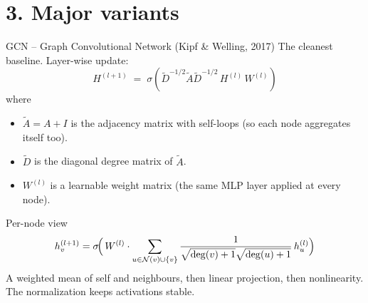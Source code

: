 \documentclass[aspectratio=169,10pt]{beamer}
\begin{document}
\section*{3. Major variants}

\begin{frame}{GCN -- Graph Convolutional Network (Kipf \& Welling, 2017)}
The cleanest baseline. Layer-wise update:
\begin{equation*}
H^{(l+1)} \;=\; \sigma\!\left( \tilde{D}^{-1/2} \tilde{A} \tilde{D}^{-1/2} \, H^{(l)} \, W^{(l)} \right)
\end{equation*}
where
\begin{itemize}
  \item $\tilde{A} = A + I$ is the adjacency matrix with self-loops (so each node aggregates itself too).
  \item $\tilde{D}$ is the diagonal degree matrix of $\tilde{A}$.
  \item $W^{(l)}$ is a learnable weight matrix (the same MLP layer applied at every node).
\end{itemize}
\vspace{0.4em}
\begin{block}{Per-node view}
\begin{equation*}
h_v^{(l+1)} = \sigma\!\Bigl(\, W^{(l)} \cdot \sum_{u \in \mathcal{N}(v) \cup \{v\}} \frac{1}{\sqrt{\deg(v)+1}\sqrt{\deg(u)+1}} \, h_u^{(l)} \Bigr)
\end{equation*}
A weighted mean of self and neighbours, then linear projection, then nonlinearity. The normalization keeps activations stable.
\end{block}
\end{frame}
\end{document}
